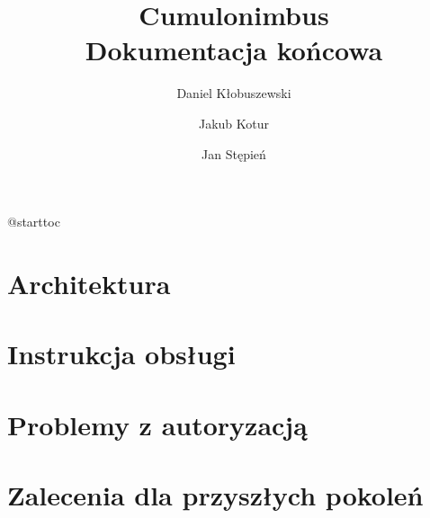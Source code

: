 

\usepackage{microtype}


\def\cb{Cumulonimbus}
\def\todo{\textbf{TODO}: }

\title{\cb{} \\ Dokumentacja końcowa}
\author{Daniel Kłobuszewski \and Jakub Kotur \and Jan Stępień}



\maketitle
\csname @starttoc

\section{Architektura}


\section{Instrukcja obsługi}


\section{Problemy z autoryzacją}


\section{Zalecenia dla przyszłych pokoleń}






